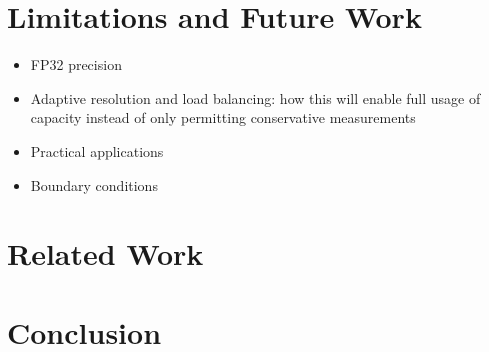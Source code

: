 \documentclass[review, anonymous, acmsmall]{acmart}
\begin{document}
\section{Limitations and Future Work}
\begin{itemize}
  \item FP32 precision
  \item Adaptive resolution and load balancing: how this will enable full usage of capacity instead of only permitting conservative measurements
  \item Practical applications
  \item Boundary conditions
\end{itemize}

\section{Related Work}

\section{Conclusion}

\begin{acks}                            %
  
\end{acks}




\end{document}
